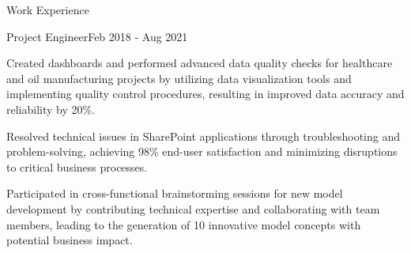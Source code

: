 \documentclass{resume} %
\begin{document}
\begin{rSection}{Work Experience}
\begin{rSubsection}
                            \end{rSubsection}
                    \begin{rSubsection}
                {Project Engineer}{Feb 2018 - Aug 2021}
                                    {}
                                {}
                                    \item Created dashboards and performed advanced data quality checks for healthcare and oil manufacturing projects by utilizing data visualization tools and implementing quality control procedures, resulting in improved data accuracy and reliability by 20\%.
                                    \item Resolved technical issues in SharePoint applications through troubleshooting and problem{-}solving, achieving 98\% end{-}user satisfaction and minimizing disruptions to critical business processes.
                                    \item Participated in cross{-}functional brainstorming sessions for new model development by contributing technical expertise and collaborating with team members, leading to the generation of 10 innovative model concepts with potential business impact.
                            \end{rSubsection}
            \end{rSection}

\end{document}
